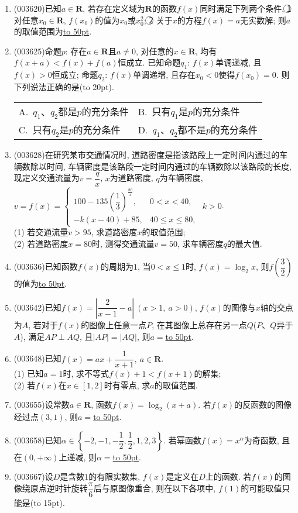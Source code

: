 \documentclass[10pt,a4paper]{article}
\newcommand{\blank}[1]{\underline{\hbox to #1pt{}}}
\newcommand{\bracket}[1]{(\hbox to #1pt{})}
\newcommand{\twoch}[4]{\par\begin{tabular}{p{.46\textwidth}p{.46\textwidth}}
A.~#1& B.~#2\\
C.~#3& D.~#4
\end{tabular}}
\begin{document}
\begin{enumerate}[1.]
\item {\tiny (003620)}已知$a\in \mathbf{R}$, 若存在定义域为$\mathbf{R}$的函数$f(x)$同时满足下列两个条件, \textcircled{1} 对任意$x_0\in \mathbf{R}$, $f(x_0)$的值为$x_0$或$x_0^2$; \textcircled{2} 关于$x$的方程$f(x)=a$无实数解; 则$a$的取值范围为\blank{50}.
\item {\tiny (003625)}命题$p$: 存在$a\in \mathbf{R}$且$a\ne 0$, 对任意的$x\in \mathbf{R}$, 均有$f(x+a)<f(x)+f(a)$恒成立. 已知命题$q_1$: $f(x)$单调递减, 且$f(x)>0$恒成立; 命题$q_2$: $f(x)$单调递增, 且存在${x_0}<0$使得$f({x_0})=0$. 则下列说法正确的是\bracket{20}.
\twoch{$q_1$、$q_2$都是$p$的充分条件}{只有$q_1$是$p$的充分条件}{只有$q_2$是$p$的充分条件}{$q_1$、$q_2$都不是$p$的充分条件}
\item {\tiny (003628)}在研究某市交通情况时, 道路密度是指该路段上一定时间内通过的车辆数除以时间, 车辆密度是该路段一定时间内通过的车辆数除以该路段的长度, 现定义交通流量为$v=\dfrac qx$, $x$为道路密度, $q$为车辆密度, $v=f(x)=\begin{cases} 100-135(\dfrac13)^{\frac{80}x}, & 0<x<40,  \\ -k(x-40)+85, & 40 \le x\le 80, \end{cases}$ $k>0$.\\
(1) 若交通流量$v>95$, 求道路密度$x$的取值范围; \\
(2) 若道路密度$x=80$时, 测得交通流量$v=50$, 求车辆密度$q$的最大值.
\item {\tiny (003636)}已知函数$f(x)$的周期为$1$, 当$0<x\le 1$时, $f(x)=\log_2 x$, 则$f\left(\dfrac{3}{2}\right)$的值为\blank{50}.
\item {\tiny (003642)}已知$f(x)=\left|\dfrac{2}{x-1}-a\right| \ (x>1, \ a>0)$, $f(x)$的图像与$x$轴的交点为$A$, 若对于$f(x)$的图像上任意一点$P$, 在其图像上总存在另一点$Q$($P$、$Q$异于$A$), 满足$AP\perp AQ$, 且$|AP|=|AQ|$, 则$a=$\blank{50}.
\item {\tiny (003648)}已知$f(x)=ax+\dfrac{1}{x+1}, \ a\in \mathbf{R}$.\\
(1) 已知$a=1$时, 求不等式$f(x)+1<f(x+1)$的解集;\\
(2) 若$f(x)$在$x\in [1,2]$时有零点, 求$a$的取值范围.
\item {\tiny (003655)}设常数$a\in \mathbf{R}$, 函数$f(x)=\log_2(x+a)$. 若$f(x)$的反函数的图像经过点$(3,1)$, 则$a=$\blank{50}.
\item {\tiny (003658)}已知$\alpha\in \left\{-2,-1,-\dfrac{1}{2},\dfrac{1}{2},1,2,3\right\}$. 若幂函数$f(x)=x^{\alpha}$为奇函数, 且在$(0,+\infty)$上递减, 则$\alpha=$\blank{50}.
\item {\tiny (003667)}设$D$是含数$1$的有限实数集, $f(x)$是定义在$D$上的函数. 若$f(x)$的图像绕原点逆时针旋转$\dfrac{\pi}{6}$后与原图像重合, 则在以下各项中, $f(1)$的可能取值只能是\bracket{15}.

\end{enumerate}
\end{document}
